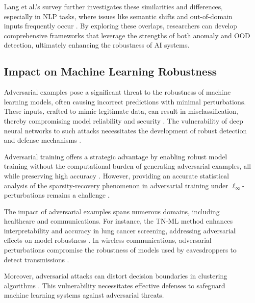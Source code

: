 Lang et al.'s survey further investigates these similarities and differences, especially in NLP tasks, where issues like semantic shifts and out-of-domain inputs frequently occur \cite{lang2023survey}. By exploring these overlaps, researchers can develop comprehensive frameworks that leverage the strengths of both anomaly and OOD detection, ultimately enhancing the robustness of AI systems.


\subsection{Impact on Machine Learning Robustness} \label{subsec:Impact on Machine Learning Robustness}

Adversarial examples pose a significant threat to the robustness of machine learning models, often causing incorrect predictions with minimal perturbations. These inputs, crafted to mimic legitimate data, can result in misclassification, thereby compromising model reliability and security \cite{cao2021understandingsecuritydeepfakedetection}. The vulnerability of deep neural networks to such attacks necessitates the development of robust detection and defense mechanisms \cite{chhabra2019suspicionfreeadversarialattacksclustering}.

Adversarial training offers a strategic advantage by enabling robust model training without the computational burden of generating adversarial examples, all while preserving high accuracy \cite{arous2023noiseyouadversarialtraining}. However, providing an accurate statistical analysis of the sparsity-recovery phenomenon in adversarial training under $\ell_\infty$-perturbations remains a challenge \cite{xie2024asymptoticbehavioradversarialtraining}.

The impact of adversarial examples spans numerous domains, including healthcare and communications. For instance, the TN-ML method enhances interpretability and accuracy in lung cancer screening, addressing adversarial effects on model robustness \cite{an2023intelligentdiagnosticschemelung}. In wireless communications, adversarial perturbations compromise the robustness of models used by eavesdroppers to detect transmissions \cite{kim2020make5gcommunicationsinvisible}.

Moreover, adversarial attacks can distort decision boundaries in clustering algorithms \cite{chhabra2019suspicionfreeadversarialattacksclustering}. This vulnerability necessitates effective defenses to safeguard machine learning systems against adversarial threats.

